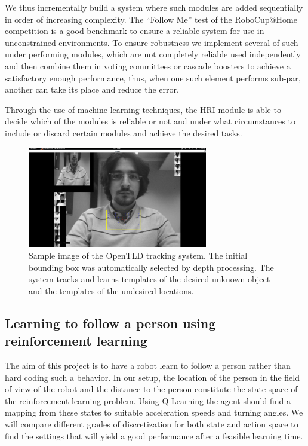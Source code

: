 \documentclass[runningheads,a4paper]{llncs}
\begin{document}
We thus incrementally build a system where such modules are added sequentially in order of increasing complexity. 
The ``Follow Me'' test of the RoboCup@Home competition is a good benchmark to ensure a reliable system for use in unconstrained environments.
To ensure robustness we implement several of such under performing modules, which are not completely reliable used independently and then combine them in voting committees or cascade boosters to achieve a satisfactory enough performance, thus, when one such element performs sub-par, another can take its place and reduce the error.

Through the use of machine learning techniques, the HRI module is able to decide which of the modules is reliable or not and under what circumstances to include or discard certain modules and achieve the desired tasks.

\begin{figure}
\centering
\includegraphics[width=0.7\textwidth]{figures/tld.png}
\caption{Sample image of the OpenTLD tracking system. The initial bounding box was automatically selected by depth processing. The system tracks and learns templates of the desired unknown object and the templates of the undesired locations.}
\label{fig:tld}
\end{figure}


\subsection{Learning to follow a person using reinforcement learning}

The aim of this project is to have a robot learn to follow a person rather than hard coding such a behavior. 
In our setup, the location of the person in the field of view of the robot and the distance to the person constitute the state space of the reinforcement learning problem.
Using Q-Learning \cite{watkins1992technical} the agent should find a mapping from these states to suitable acceleration speeds and turning angles. 
We will compare different grades of discretization for both state and action space to find the settings that will yield a good performance after a feasible learning time.
\end{document}
